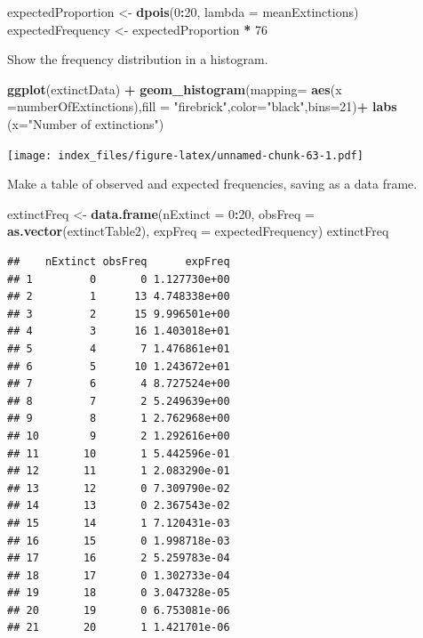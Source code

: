 \documentclass[]{article}
\newenvironment{Shaded}{\begin{snugshade}}{\end{snugshade}}
\newcommand{\DataTypeTok}[1]{\textcolor[rgb]{0.13,0.29,0.53}{#1}}
\newcommand{\DecValTok}[1]{\textcolor[rgb]{0.00,0.00,0.81}{#1}}
\newcommand{\KeywordTok}[1]{\textcolor[rgb]{0.13,0.29,0.53}{\textbf{#1}}}
\newcommand{\NormalTok}[1]{#1}
\newcommand{\OperatorTok}[1]{\textcolor[rgb]{0.81,0.36,0.00}{\textbf{#1}}}
\newcommand{\StringTok}[1]{\textcolor[rgb]{0.31,0.60,0.02}{#1}}
\begin{document}
\begin{Shaded}
\begin{Highlighting}[]
\NormalTok{expectedProportion <-}\StringTok{ }\KeywordTok{dpois}\NormalTok{(}\DecValTok{0}\OperatorTok{:}\DecValTok{20}\NormalTok{, }\DataTypeTok{lambda =}\NormalTok{ meanExtinctions)}
\NormalTok{expectedFrequency <-}\StringTok{ }\NormalTok{expectedProportion }\OperatorTok{*}\StringTok{ }\DecValTok{76}
\end{Highlighting}
\end{Shaded}

Show the frequency distribution in a histogram.

\begin{Shaded}
\begin{Highlighting}[]
\KeywordTok{ggplot}\NormalTok{(extinctData) }\OperatorTok{+}
\StringTok{  }\KeywordTok{geom_histogram}\NormalTok{(}\DataTypeTok{mapping=} \KeywordTok{aes}\NormalTok{(}\DataTypeTok{x =}\NormalTok{numberOfExtinctions),}\DataTypeTok{fill =} \StringTok{"firebrick"}\NormalTok{,}\DataTypeTok{color=}\StringTok{"black"}\NormalTok{,}\DataTypeTok{bins=}\DecValTok{21}\NormalTok{)}\OperatorTok{+}\StringTok{    }
\StringTok{  }\KeywordTok{labs}\NormalTok{ (}\DataTypeTok{x=}\StringTok{"Number of extinctions"}\NormalTok{)}
\end{Highlighting}
\end{Shaded}

\texttt{[image: index\_files/figure-latex/unnamed-chunk-63-1.pdf]}

Make a table of observed and expected frequencies, saving as a data
frame.

\begin{Shaded}
\begin{Highlighting}[]
\NormalTok{extinctFreq <-}\StringTok{ }\KeywordTok{data.frame}\NormalTok{(}\DataTypeTok{nExtinct =} \DecValTok{0}\OperatorTok{:}\DecValTok{20}\NormalTok{, }\DataTypeTok{obsFreq =} \KeywordTok{as.vector}\NormalTok{(extinctTable2), }
    \DataTypeTok{expFreq =}\NormalTok{ expectedFrequency)}
\NormalTok{extinctFreq}
\end{Highlighting}
\end{Shaded}

\begin{verbatim}
##    nExtinct obsFreq      expFreq
## 1         0       0 1.127730e+00
## 2         1      13 4.748338e+00
## 3         2      15 9.996501e+00
## 4         3      16 1.403018e+01
## 5         4       7 1.476861e+01
## 6         5      10 1.243672e+01
## 7         6       4 8.727524e+00
## 8         7       2 5.249639e+00
## 9         8       1 2.762968e+00
## 10        9       2 1.292616e+00
## 11       10       1 5.442596e-01
## 12       11       1 2.083290e-01
## 13       12       0 7.309790e-02
## 14       13       0 2.367543e-02
## 15       14       1 7.120431e-03
## 16       15       0 1.998718e-03
## 17       16       2 5.259783e-04
## 18       17       0 1.302733e-04
## 19       18       0 3.047328e-05
## 20       19       0 6.753081e-06
## 21       20       1 1.421701e-06
\end{verbatim}
\end{document}
